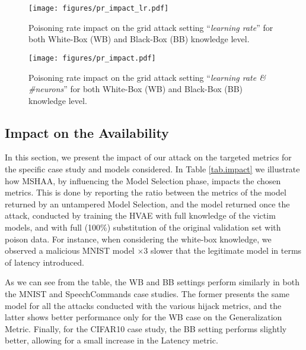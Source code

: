 \begin{figure}
    \centering
    \texttt{[image: figures/pr\_impact\_lr.pdf]}
    \caption{Poisoning rate impact on the grid attack setting ``\textit{learning rate}'' for both White-Box (WB) and Black-Box (BB) knowledge level. }
    \label{fig:pr-impact-lr}
\end{figure}
 
\begin{figure}
    \centering
    \texttt{[image: figures/pr\_impact.pdf]}
    \caption{Poisoning rate impact on the grid attack setting ``\textit{learning rate \& \#neurons}'' for both White-Box (WB) and Black-Box (BB) knowledge level. }
    \label{fig:pr-impact}
\end{figure}


\subsection{Impact on the Availability}
In this section, we present the impact of our attack on the targeted metrics for the specific case study and models considered. 
In Table \ref{tab.impact} we illustrate how MSHAA, by influencing the Model Selection phase, impacts the chosen metrics. This is done by reporting the ratio between the metrics of the model returned by an untampered Model Selection, and the model returned once the attack, conducted by training the HVAE with full knowledge of the victim models, and with full (100\%) substitution of the original validation set with poison data. 
For instance, when considering the white-box knowledge, we observed a malicious MNIST model $\times3$ slower that the legitimate model in terms of latency introduced. 
\par
As we can see from the table, the WB and BB settings perform similarly in both the MNIST and SpeechCommands case studies. The former presents the same model for all the attacks conducted with the various hijack metrics, and the latter shows better performance only for the WB case on the Generalization Metric. Finally, for the CIFAR10 case study, the BB setting performs slightly better, allowing for a small increase in the Latency metric.


